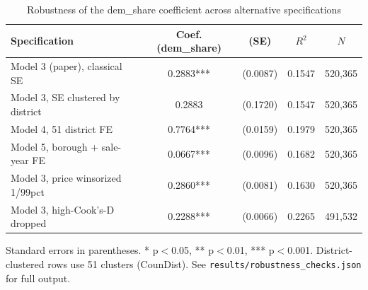 \begin{table}[htbp]
\centering
\caption{Robustness of the dem\_share coefficient across alternative specifications}
\label{tab:robustness}
\begin{tabular}{lcccc}
\toprule
Specification & Coef. (dem\_share) & (SE) & $R^2$ & $N$ \\
\midrule
Model 3 (paper), classical SE & 0.2883*** & (0.0087) & 0.1547 & 520,365 \\
Model 3, SE clustered by district & 0.2883 & (0.1720) & 0.1547 & 520,365 \\
Model 4, 51 district FE & 0.7764*** & (0.0159) & 0.1979 & 520,365 \\
Model 5, borough + sale-year FE & 0.0667*** & (0.0096) & 0.1682 & 520,365 \\
Model 3, price winsorized 1/99pct & 0.2860*** & (0.0081) & 0.1630 & 520,365 \\
Model 3, high-Cook's-D dropped & 0.2288*** & (0.0066) & 0.2265 & 491,532 \\
\bottomrule
\end{tabular}
\vspace{2pt}
\begin{minipage}{0.95\textwidth}
\footnotesize Standard errors in parentheses. * p$<$0.05, ** p$<$0.01, *** p$<$0.001. District-clustered rows use 51 clusters (CounDist). See \texttt{results/robustness\_checks.json} for full output.
\end{minipage}
\end{table}
